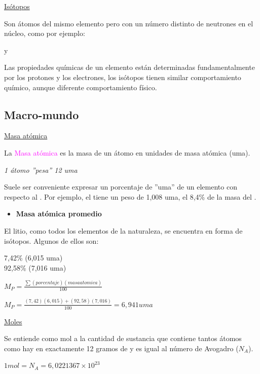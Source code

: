 \begin{itemize}
            \begin{center} \underline{Isótopos} \end{center}
                \indent Son átomos del mismo elemento pero con un número distinto de neutrones en el núcleo, como por ejemplo:
                \begin{center}  y  \end{center}
                \indent Las propiedades químicas de un elemento están determinadas fundamentalmente por los protones y los electrones, los isótopos tienen similar comportamiento químico, aunque diferente comportamiento físico.

    \subsection{Macro-mundo}
        \begin{center} \underline{Masa atómica} \end{center}
            \indent La \textcolor{magenta}{Masa atómica} es la masa de un átomo en unidades de masa atómica (uma).
            \begin{center} \textit{1 átomo  ''pesa'' 12 uma} \end{center}
            \indent Suele ser conveniente expresar un porcentaje de ''uma'' de un elemento con respecto al . Por ejemplo, el  tiene un peso de 1,008 uma, el 8,4\% de la masa del .
            \begin{itemize} \item \textbf{Masa atómica promedio} \end{itemize}
            \indent El litio, como todos los elementos de la naturaleza, se encuentra en forma de isótopos. Algunos de ellos son: \begin{center} 7,42\%  (6,015 uma) \\ 92,58\%  (7,016 uma) \end{center}
            \begin{center} $M_P = \frac{\sum{(porcentaje)(masa atomica)}}{100}$ \end{center}
            \begin{center} $M_P = \frac{(7,42)(6,015) + (92,58)(7,016)}{100} = 6,941 uma$ \end{center}

        \begin{center} \underline{Moles} \end{center}
            \indent Se entiende como mol a la cantidad de sustancia que contiene tantos átomos como hay en exactamente 12 gramos de  y es igual al número de Avogadro ($N_A$).
            \begin{center} $1 mol = N_A = 6,0221367 \times 10^{23}$ \end{center}


\end{itemize}
